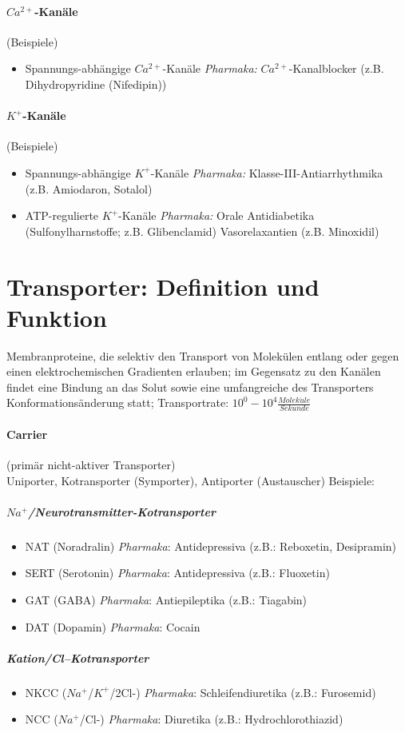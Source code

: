 \documentclass[10pt,a4paper]{report}
\begin{document}
\paragraph{$Ca^{2+}$-Kanäle} (Beispiele)
\begin{itemize}
	\item Spannungs-abhängige $Ca^{2+}$-Kanäle \textit{Pharmaka:} $Ca^{2+}$-Kanalblocker (z.B. Dihydropyridine (Nifedipin))
\end{itemize}
\paragraph{$K^+$-Kanäle} (Beispiele)
\begin{itemize}
	\item Spannungs-abhängige $K^+$-Kanäle \textit{Pharmaka:} Klasse-III-Antiarrhythmika (z.B. Amiodaron, Sotalol)
	\item ATP-regulierte  $K^+$-Kanäle \textit{Pharmaka:} 	Orale Antidiabetika (Sulfonylharnstoffe; z.B. Glibenclamid)
Vasorelaxantien (z.B. Minoxidil)
\end{itemize}
\section{Transporter: Definition und Funktion}
Membranproteine, die selektiv den Transport von Molekülen entlang oder gegen einen elektrochemischen Gradienten erlauben; im Gegensatz zu den Kanälen findet eine Bindung an das Solut sowie eine umfangreiche  des Transporters Konformationsänderung statt; Transportrate: $10^0-10^4 \frac{Molek\ddot{u}le}{Sekunde}$
\paragraph{Carrier} (primär nicht-aktiver Transporter) \\
	Uniporter, Kotransporter (Symporter), Antiporter (Austauscher)
	Beispiele:
\subparagraph{$Na^+$/Neurotransmitter-Kotransporter}
\begin{itemize}
	\item NAT (Noradralin)	\textit{Pharmaka}: Antidepressiva (z.B.: Reboxetin, Desipramin)
	\item SERT (Serotonin)	\textit{Pharmaka}: Antidepressiva (z.B.: Fluoxetin) 
	\item GAT (GABA)	\textit{Pharmaka}: Antiepileptika (z.B.: Tiagabin)
	\item DAT (Dopamin)	\textit{Pharmaka}: Cocain
\end{itemize} 
\subparagraph{Kation/Cl--Kotransporter}
\begin{itemize}
	\item NKCC ($Na^+$/$K^+$/2Cl-)	\textit{Pharmaka}: Schleifendiuretika (z.B.: Furosemid)
	\item NCC ($Na^+$/Cl-)		\textit{Pharmaka}: Diuretika (z.B.: Hydrochlorothiazid)
\end{itemize} 
\end{document}

